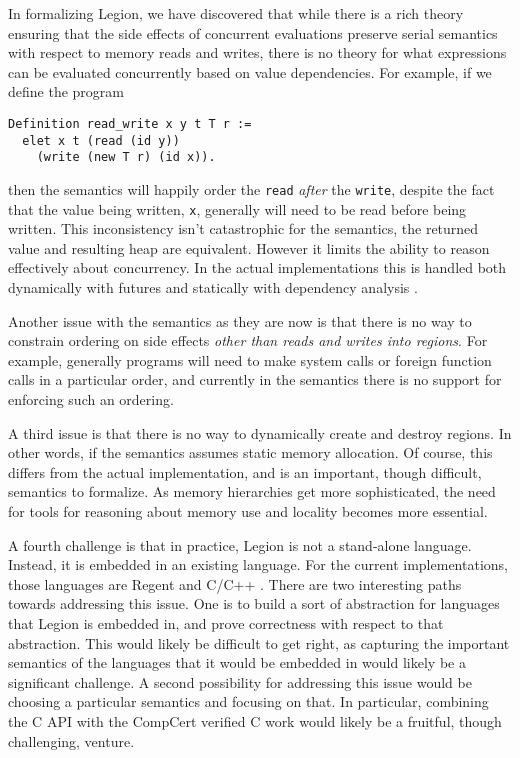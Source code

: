 \documentclass[sigconf]{acmart}
\begin{document}
In formalizing Legion, we have discovered that while there is a rich theory
ensuring that the side effects of concurrent evaluations preserve serial
semantics with respect to memory reads and writes, there is no theory for what
expressions can be evaluated concurrently based on value dependencies. For
example, if we define the program
\begin{center}
\begin{BVerbatim}
Definition read_write x y t T r :=
  elet x t (read (id y)) 
    (write (new T r) (id x)).
\end{BVerbatim}
\end{center}
then the semantics will happily order the \texttt{read} \emph{after} the
\texttt{write}, despite the fact that the value being written, \texttt{x},
generally will need to be read before being written. This inconsistency isn't catastrophic
for the semantics, the returned value and resulting heap are equivalent. 
 However it limits the ability to reason effectively about concurrency. 
In the actual implementations this is handled both dynamically with futures
and statically with dependency analysis \cite{slaughter2015regent}.

Another issue with the semantics as they are now is that there is no way to 
constrain ordering on side effects \emph{other than reads and writes into
regions}. For example, generally programs will need to make system calls or
foreign function calls in a particular order, and currently in the semantics
there is no support for enforcing such an ordering.

A third issue is that there is no way to dynamically create and destroy
regions. In other words, if the semantics assumes static memory allocation.
Of course, this differs from the actual implementation, and is an important,
though difficult, semantics to formalize. As memory hierarchies get more 
sophisticated, the need for tools for reasoning about memory use and locality
becomes more essential. 

A fourth challenge is that in practice, Legion is not a stand-alone language.
Instead, it is embedded in an existing language. For the current implementations, 
those languages are Regent and C/C++ \cite{slaughter2015regent}. There are two 
interesting paths towards addressing this issue. One is to build a sort of
abstraction for languages that Legion is embedded in, and prove correctness
with respect to that abstraction. This would likely be difficult to get right,
as capturing the important semantics of the languages that it would be embedded
in would likely be a significant challenge. A second possibility for addressing
this issue would be choosing a particular semantics and focusing on that. In
particular, combining the C API with the CompCert verified C work would likely
be a fruitful, though challenging, venture. 
\end{document}
